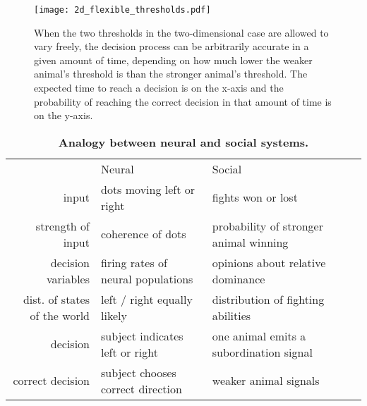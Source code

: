 \documentclass{article}
\newcommand{\ra}[1]{\renewcommand{\arraystretch}{#1}}
\begin{document}
\begin{figure}
\texttt{[image: 2d\_flexible\_thresholds.pdf]}
\caption{\label{2dthresh} When the two thresholds in the two-dimensional case are allowed to vary freely, the decision process can be arbitrarily accurate in a given amount of time, depending on how much lower the weaker animal's threshold is than the stronger animal's threshold.  The expected time to reach a decision is on the x-axis and the probability of reaching the correct decision in that amount of time is on the y-axis.}
\end{figure}

\begin{table}
\centering
\caption{\label{analogy}{\bf  Analogy between neural and social systems.} }
\ra{1.3}
\begin{tabular}{@{}rllll@{}}
&Neural &   Social \\
\cmidrule{2-2} \cmidrule{3-3} 
input & dots moving left or right & fights won or lost
\\strength of input & coherence of dots & probability of stronger animal winning
\\decision variables &  firing rates of neural populations & opinions about relative dominance
\\ dist. of states of the world & left / right equally likely & distribution of fighting abilities
\\ decision & subject indicates left or right & one animal emits a subordination signal
\\ correct decision & subject chooses correct direction & weaker animal signals
\end{tabular}
\end{table}
\end{document}
